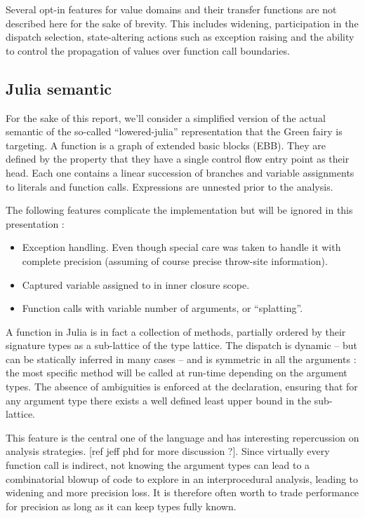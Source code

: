 \documentclass[14pt]{article}
\begin{document}
Several opt-in features for value domains and their transfer functions are not described here for the sake of brevity. This includes widening, participation in the dispatch selection, state-altering actions such as exception raising and the ability to control the propagation of values over function call boundaries.

\subsection*{Julia semantic}

For the sake of this report, we'll consider a simplified version of the actual semantic of the so-called ``lowered-julia'' representation that the Green fairy is targeting. A function is a graph of extended basic blocks (EBB). They are defined by the property that they have a single control flow entry point as their head. Each one contains a linear succession of branches and variable assignments to literals and function calls. Expressions are unnested prior to the analysis.

The following features complicate the implementation but will be ignored in this presentation :
\begin{itemize}
\item Exception handling. Even though special care was taken to handle it with complete precision (assuming of course precise throw-site information).
\item Captured variable assigned to in inner closure scope.
\item Function calls with variable number of arguments, or ``splatting''.
\end{itemize}

A function in Julia is in fact a collection of methods, partially ordered by their signature types as a sub-lattice of the type lattice.
The dispatch is dynamic -- but can be statically inferred in many cases -- and is symmetric in all the arguments : the most specific method will be called at run-time depending on the argument types.
The absence of ambiguities is enforced at the declaration, ensuring that for any argument type there exists a well defined least upper bound in the sub-lattice.

This feature is the central one of the language and has interesting repercussion on analysis strategies. [ref jeff phd for more discussion ?]. Since virtually every function call is indirect, not knowing the argument types can lead to a combinatorial blowup of code to explore in an interprocedural analysis, leading to widening and more precision loss. It is therefore often worth to trade performance for precision as long as it can keep types fully known.
\end{document}
